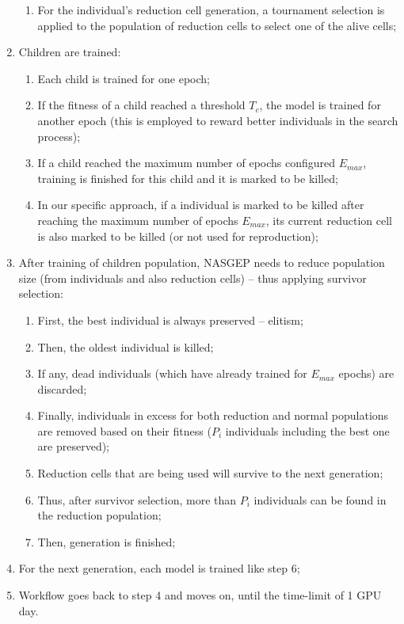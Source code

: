 \documentclass[conference]{IEEEtran}
\begin{document}
\begin{enumerate}
\begin{enumerate}
			\item For the individual's reduction cell generation, a tournament selection is applied to the population of reduction cells to select one of the alive cells;
		\end{enumerate} 		
		\item Children are trained:
		\begin{enumerate}
			\item Each child is trained for one epoch;
			\item If the fitness of a child reached a threshold $T_c$, the model is trained for another epoch (this is employed to reward better individuals in the search process);
			\item If a child reached the maximum number of epochs configured $E_{max}$, training is finished for this child and it is marked to be killed;
			\item In our specific approach, if a individual is marked to be killed after reaching the maximum number of epochs $E_{max}$, its current reduction cell is also marked to be killed (or not used for reproduction);
		\end{enumerate}
		\item After training of children population, NASGEP needs to reduce population size (from individuals and also reduction cells) -- thus applying survivor selection:
		\begin{enumerate}
			\item First, the best individual is always preserved -- elitism;
			\item Then, the oldest individual is killed;
			\item If any, dead individuals (which have already trained for $E_{max}$ epochs) are discarded;
			\item Finally, individuals in excess for both reduction and normal populations are removed based on their fitness ($P_i$ individuals including the best one are preserved);
			\item Reduction cells that are being used will survive to the next generation;	
			\item Thus, after survivor selection, more than $P_i$ individuals can be found in the reduction population;
			\item Then, generation is finished;
		\end{enumerate}
		\item For the next generation, each model is trained like step 6;
		\item Workflow goes back to step 4 and moves on, until the time-limit of 1 GPU day.
		
	\end{enumerate}
	
\end{document}
